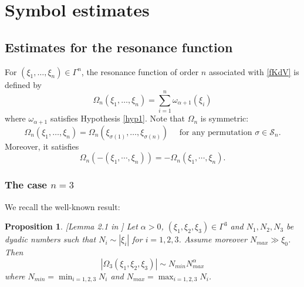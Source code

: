 \documentclass{amsart}
\newtheorem{proposition}[theorem]{Proposition}
\theoremstyle{definition}
\theoremstyle{remark}
\numberwithin{equation}{section}
\begin{document}
\section{Symbol estimates} \label{app:symbols}
\subsection{Estimates for the resonance function}
For $(\xi_1,\ldots, \xi_n)\in \Gamma^{n}$, the resonance function of order $n$ associated with \eqref{fKdV} is defined by
$$
\Omega_n(\xi_1,\ldots, \xi_n) = \sum_{i=1}^n \omega_{\alpha+1}(\xi_i)
$$
where $\omega_{\alpha+1}$  satisfies Hypothesis \ref{hyp1}.
 Note that $\Omega_n$ is symmetric:
\begin{equation}\label{sym-Omega}
  \Omega_n(\xi_1,\ldots,\xi_n) = \Omega_n(\xi_{\sigma(1)},\ldots,\xi_{\sigma(n)}) \quad \textrm{ for any permutation }\sigma\in \mathcal{S}_n.
\end{equation}
Moreover, it satisfies
\begin{equation}\label{prop-Omega}
  \Omega_n(-(\xi_1,\cdots,\xi_n)) = -\Omega_n(\xi_1,\cdots,\xi_n).
\end{equation}
\subsubsection{The case $n=3$}
We recall the well-known result:
\begin{proposition}\label{est-Omega3}[Lemma 2.1 in \cite{MV}]
  Let $\alpha>0$,  $(\xi_1,\xi_2, \xi_3)\in \Gamma^3$ and $N_1,N_2,N_3$ be dyadic numbers such that $N_i\sim |\xi_i|$ for $i=1,2,3$. Assume moreover $N_{max} \gg \xi_0$. Then 
  \begin{equation}\label{est-Omega3.0}
    |\Omega_3(\xi_1,\xi_2,\xi_3)| \sim N_{min}N_{max}^\alpha
  \end{equation}
  where $N_{min}=\min_{i=1,2,3}N_i$ and $N_{max}=\max_{i=1,2,3}N_i$.
\end{proposition}
\end{document}
